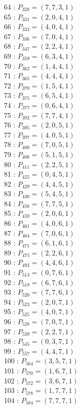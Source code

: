\documentclass{article}
\begin{document}
{\begin{multicols}{3}
64 : $P_{328}=( 7, 7, 3, 1 )$\\
65 : $P_{331}=( 2, 0, 4, 1 )$\\
66 : $P_{333}=( 4, 0, 4, 1 )$\\
67 : $P_{336}=( 7, 0, 4, 1 )$\\
68 : $P_{347}=( 2, 2, 4, 1 )$\\
69 : $P_{359}=( 6, 3, 4, 1 )$\\
70 : $P_{362}=( 1, 4, 4, 1 )$\\
71 : $P_{365}=( 4, 4, 4, 1 )$\\
72 : $P_{370}=( 1, 5, 4, 1 )$\\
73 : $P_{375}=( 6, 5, 4, 1 )$\\
74 : $P_{377}=( 0, 6, 4, 1 )$\\
75 : $P_{392}=( 7, 7, 4, 1 )$\\
76 : $P_{395}=( 2, 0, 5, 1 )$\\
77 : $P_{397}=( 4, 0, 5, 1 )$\\
78 : $P_{400}=( 7, 0, 5, 1 )$\\
79 : $P_{406}=( 5, 1, 5, 1 )$\\
80 : $P_{411}=( 2, 2, 5, 1 )$\\
81 : $P_{425}=( 0, 4, 5, 1 )$\\
82 : $P_{429}=( 4, 4, 5, 1 )$\\
83 : $P_{430}=( 5, 4, 5, 1 )$\\
84 : $P_{456}=( 7, 7, 5, 1 )$\\
85 : $P_{459}=( 2, 0, 6, 1 )$\\
86 : $P_{461}=( 4, 0, 6, 1 )$\\
87 : $P_{464}=( 7, 0, 6, 1 )$\\
88 : $P_{471}=( 6, 1, 6, 1 )$\\
89 : $P_{475}=( 2, 2, 6, 1 )$\\
90 : $P_{493}=( 4, 4, 6, 1 )$\\
91 : $P_{513}=( 0, 7, 6, 1 )$\\
92 : $P_{519}=( 6, 7, 6, 1 )$\\
93 : $P_{520}=( 7, 7, 6, 1 )$\\
94 : $P_{523}=( 2, 0, 7, 1 )$\\
95 : $P_{525}=( 4, 0, 7, 1 )$\\
96 : $P_{528}=( 7, 0, 7, 1 )$\\
97 : $P_{539}=( 2, 2, 7, 1 )$\\
98 : $P_{545}=( 0, 3, 7, 1 )$\\
99 : $P_{557}=( 4, 4, 7, 1 )$\\
100 : $P_{564}=( 3, 5, 7, 1 )$\\
101 : $P_{570}=( 1, 6, 7, 1 )$\\
102 : $P_{572}=( 3, 6, 7, 1 )$\\
103 : $P_{578}=( 1, 7, 7, 1 )$\\
104 : $P_{584}=( 7, 7, 7, 1 )$\\
\end{multicols}


}
\end{document}
